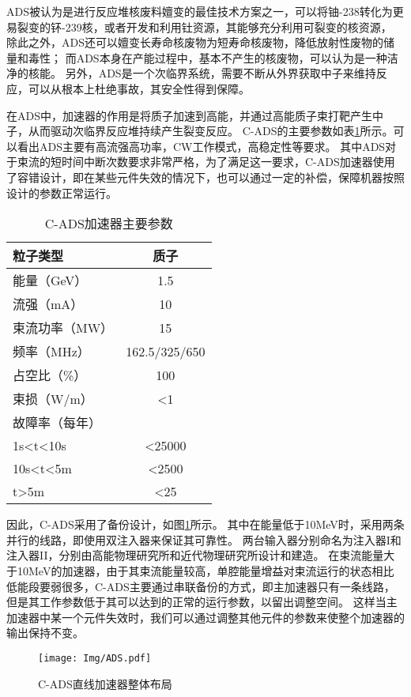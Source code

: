 ADS被认为是进行反应堆核废料嬗变的最佳技术方案之一，可以将铀-238转化为更易裂变的钚-239核，或者开发和利用钍资源，其能够充分利用可裂变的核资源，
除此之外，ADS还可以嬗变长寿命核废物为短寿命核废物，降低放射性废物的储量和毒性；
而ADS本身在产能过程中，基本不产生的核废物，可以认为是一种洁净的核能。
另外，ADS是一个次临界系统，需要不断从外界获取中子来维持反应，可以从根本上杜绝事故，其安全性得到保障。

在ADS中，加速器的作用是将质子加速到高能，并通过高能质子束打靶产生中子，从而驱动次临界反应堆持续产生裂变反应。
C-ADS的主要参数如表\ref{tab:C_ADS_parameter}所示\cite{zhihuili2011ADS}。可以看出ADS主要有高流强高功率，CW工作模式，高稳定性等要求。
其中ADS对于束流的短时间中断次数要求非常严格，为了满足这一要求，C-ADS加速器使用了容错设计，即在某些元件失效的情况下，也可以通过一定的补偿，保障机器按照设计的参数正常运行。

\begin{table}[!htb]
  \centering
  \begin{tabular}{>{\small}l|c}
    \hline
    粒子类型              &质子  \\
    \hline
    能量（GeV）           &1.5   \\
    \hline
    流强（mA）            &10    \\
    \hline
    束流功率（MW）        &15    \\
    \hline
    频率（MHz）           &162.5/325/650  \\
    \hline
    占空比（\%）          &100   \\
    \hline
    束损（W/m）           &<1    \\
    \hline
    故障率（每年）        & \\
    \qquad 1s<t<10s        & <25000 \\
    \qquad 10s<t<5m        & <2500  \\
    \qquad t>5m            & <25    \\
    \hline
  \end{tabular}
  \caption{C-ADS加速器主要参数}
  \label{tab:C_ADS_parameter}
\end{table}

因此，C-ADS采用了备份设计，如图\ref{fig:ADS_two_injector}所示\cite{fang2014physics,fang2016instability}。
其中在能量低于10MeV时，采用两条并行的线路，即使用双注入器来保证其可靠性。
两台输入器分别命名为注入器I和注入器II，分别由高能物理研究所和近代物理研究所设计和建造。
在束流能量大于10MeV的加速器，由于其束流能量较高，单腔能量增益对束流运行的状态相比低能段要弱很多，C-ADS主要通过串联备份的方式，即主加速器只有一条线路，但是其工作参数低于其可以达到的正常的运行参数，以留出调整空间。
这样当主加速器中某一个元件失效时，我们可以通过调整其他元件的参数来使整个加速器的输出保持不变。


\begin{figure}[!htb]
    \centering
    \texttt{[image: Img/ADS.pdf]}
    \caption{C-ADS直线加速器整体布局}
    \label{fig:ADS_two_injector}
\end{figure}


